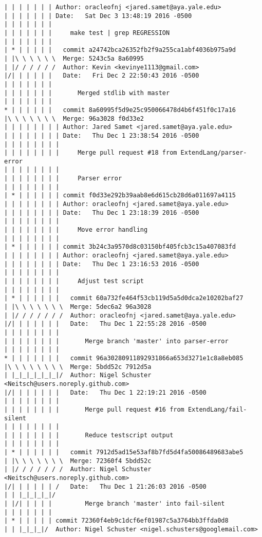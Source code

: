 \begin{lstlisting}
| | | | | | | Author: oracleofnj <jared.samet@aya.yale.edu>
| | | | | | | Date:   Sat Dec 3 13:48:19 2016 -0500
| | | | | | | 
| | | | | | |     make test | grep REGRESSION
| | | | | | |          
| * | | | | |   commit a24742bca26352fb2f9a255ca1abf4036b975a9d
| |\ \ \ \ \ \  Merge: 5243c5a 8a60995
| |/ / / / / /  Author: Kevin <kevinye1113@gmail.com>
|/| | | | | |   Date:   Fri Dec 2 22:50:43 2016 -0500
| | | | | | |   
| | | | | | |       Merged stdlib with master
| | | | | | |          
* | | | | | |   commit 8a60995f5d9e25c950066478d4b6f451f0c17a16
|\ \ \ \ \ \ \  Merge: 96a3028 f0d33e2
| | | | | | | | Author: Jared Samet <jared.samet@aya.yale.edu>
| | | | | | | | Date:   Thu Dec 1 23:38:54 2016 -0500
| | | | | | | | 
| | | | | | | |     Merge pull request #18 from ExtendLang/parser-error
| | | | | | | |     
| | | | | | | |     Parser error
| | | | | | | |         
| * | | | | | | commit f0d33e292b39aab8e6d615cb28d6a011697a4115
| | | | | | | | Author: oracleofnj <jared.samet@aya.yale.edu>
| | | | | | | | Date:   Thu Dec 1 23:18:39 2016 -0500
| | | | | | | | 
| | | | | | | |     Move error handling
| | | | | | | |         
| * | | | | | | commit 3b24c3a9570d8c03150bf405fcb3c15a407083fd
| | | | | | | | Author: oracleofnj <jared.samet@aya.yale.edu>
| | | | | | | | Date:   Thu Dec 1 23:16:53 2016 -0500
| | | | | | | | 
| | | | | | | |     Adjust test script
| | | | | | | |           
| * | | | | | |   commit 60a732fe464f53cb119d5a5d0dca2e10202baf27
| |\ \ \ \ \ \ \  Merge: 5dec6a2 96a3028
| |/ / / / / / /  Author: oracleofnj <jared.samet@aya.yale.edu>
|/| | | | | | |   Date:   Thu Dec 1 22:55:28 2016 -0500
| | | | | | | |   
| | | | | | | |       Merge branch 'master' into parser-error
| | | | | | | |           
* | | | | | | |   commit 96a30280911892931866a653d3271e1c8a8eb085
|\ \ \ \ \ \ \ \  Merge: 5bdd52c 7912d5a
| |_|_|_|_|_|_|/  Author: Nigel Schuster <Neitsch@users.noreply.github.com>
|/| | | | | | |   Date:   Thu Dec 1 22:19:21 2016 -0500
| | | | | | | |   
| | | | | | | |       Merge pull request #16 from ExtendLang/fail-silent
| | | | | | | |       
| | | | | | | |       Reduce testscript output
| | | | | | | |           
| * | | | | | |   commit 7912d5ad15e53af8b7fd5d4fa50086489683abe5
| |\ \ \ \ \ \ \  Merge: 72360f4 5bdd52c
| |/ / / / / / /  Author: Nigel Schuster <Neitsch@users.noreply.github.com>
|/| | | | | | /   Date:   Thu Dec 1 21:26:03 2016 -0500
| | |_|_|_|_|/    
| |/| | | | |         Merge branch 'master' into fail-silent
| | | | | | |        
| * | | | | | commit 72360f4eb9c1dcf6ef01987c5a3764bb3ffda0d8
| | |_|_|_|/  Author: Nigel Schuster <nigel.schusters@googlemail.com>

\end{lstlisting}
